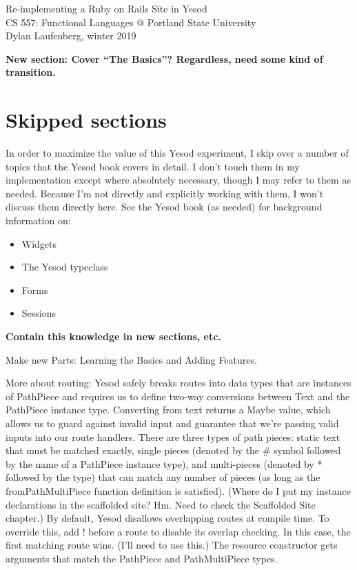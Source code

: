 \documentclass{article}
\newcommand {\todo}[1] {{\textbf{\color{red}#1}}}
\begin{document}
\begin{center}
    \Huge Re-implementing a Ruby on Rails Site in Yesod \\
    \large CS 557: Functional Languages @ Portland State University \\
    Dylan Laufenberg, winter 2019
\end{center}



\todo{New section: Cover ``The Basics''? Regardless, need some kind of transition.}





\section{Skipped sections}

In order to maximize the value of this Yesod experiment, I skip over a number of topics that the Yesod book covers in detail. I don't touch them in my implementation except where absolutely necessary, though I may refer to them as needed. Because I'm not directly and explicitly working with them, I won't discuss them directly here. See the Yesod book (as needed) for background information on:

\begin{itemize}
  \item Widgets
  \item The Yesod typeclass
  \item Forms
  \item Sessions
\end{itemize}

\todo{Contain this knowledge in new sections, etc.}

Make new Parts: Learning the Basics and Adding Features.

More about routing:
  Yesod safely breaks routes into data types that are instances of PathPiece and requires us to define two-way conversions between Text and the PathPiece instance type. Converting from text returns a Maybe value, which allows us to guard against invalid input and guarantee that we're passing valid inputs into our route handlers.
  There are three types of path pieces: static text that must be matched exactly, single pieces (denoted by the # symbol followed by the name of a PathPiece instance type), and multi-pieces (denoted by * followed by the type) that can match any number of pieces (as long as the fromPathMultiPiece function definition is satisfied). (Where do I put my instance declarations in the scaffolded site? Hm. Need to check the Scaffolded Site chapter.)
  By default, Yesod disallows overlapping routes at compile time. To override this, add ! before a route to disable its overlap checking. In this case, the first matching route wins. (I'll need to use this.)
  The resource constructor gets arguments that match the PathPiece and PathMultiPiece types.
\end{document}
